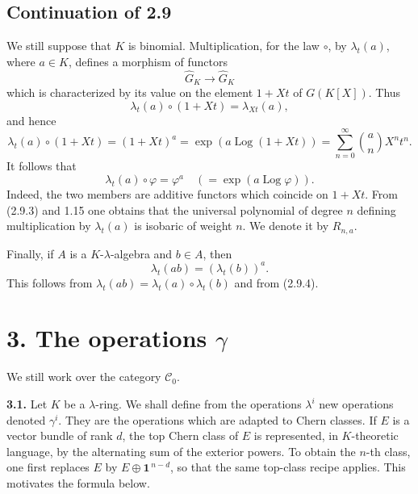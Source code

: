 \documentclass[11pt]{article}
\newcommand{\Fil}{\operatorname{Fil}}
\providecommand{\eps}{\varepsilon}
\begin{document}
\providecommand{\Ghat}{\widehat G}
\providecommand{\Gg}{\widehat G_g}
\providecommand{\Gcirc}{\widehat G_{\circ}}
\providecommand{\Gnabla}{\widehat G_{\nabla}}
\providecommand{\Grhat}{\widehat{\operatorname{Gr}}}
\providecommand{\Log}{\operatorname{Log}}
\providecommand{\Fil}{\operatorname{Fil}}
\providecommand{\eps}{\varepsilon}
\providecommand{\id}{\operatorname{id}}
\providecommand{\Sym}{\operatorname{Sym}}
\providecommand{\Mon}{\operatorname{Mon}}


\subsection*{Continuation of 2.9}

We still suppose that \(K\) is binomial. Multiplication, for the law \(\circ\), by \(\lambda_t(a)\), where \(a\in K\), defines a morphism of functors
\[
  \Ghat_K\longrightarrow \Ghat_K
\]
which is characterized by its value on the element \(1+Xt\) of \(G(K[X])\). Thus
\[
  \lambda_t(a)\circ(1+Xt)=\lambda_{Xt}(a),
\]
and hence
\begin{equation}\tag{2.9.3}
  \lambda_t(a)\circ(1+Xt)
  =(1+Xt)^a
  =\exp(a\Log(1+Xt))
  =\sum_{n=0}^{\infty}\binom{a}{n}X^nt^n .
\end{equation}
It follows that
\begin{equation}\tag{2.9.4}
  \lambda_t(a)\circ\varphi=\varphi^a
  \quad(=\exp(a\Log\varphi)).
\end{equation}
Indeed, the two members are additive functors which coincide on \(1+Xt\). From (2.9.3) and 1.15 one obtains that the universal polynomial of degree \(n\) defining multiplication by \(\lambda_t(a)\) is isobaric of weight \(n\). We denote it by \(R_{n,a}\).

Finally, if \(A\) is a \(K\)-\(\lambda\)-algebra and \(b\in A\), then
\begin{equation}\tag{2.9.5}
  \lambda_t(ab)=(\lambda_t(b))^a .
\end{equation}
This follows from \(\lambda_t(ab)=\lambda_t(a)\circ\lambda_t(b)\) and from (2.9.4).

\section*{3. The operations \(\gamma\)}

We still work over the category \(\mathscr C_0\).

\textbf{3.1.} Let \(K\) be a \(\lambda\)-ring. We shall define from the operations \(\lambda^i\) new operations denoted \(\gamma^i\). They are the operations which are adapted to Chern classes. If \(E\) is a vector bundle of rank \(d\), the top Chern class of \(E\) is represented, in \(K\)-theoretic language, by the alternating sum of the exterior powers. To obtain the \(n\)-th class, one first replaces \(E\) by \(E\oplus\mathbf1^{\,n-d}\), so that the same top-class recipe applies. This motivates the formula below.
\end{document}
